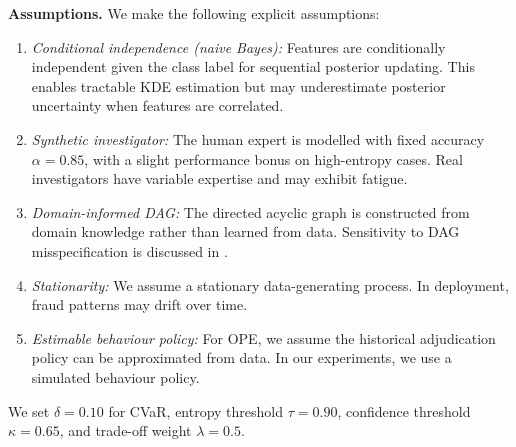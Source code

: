 \noindent\textbf{Assumptions.} We make the following explicit assumptions:
\begin{enumerate}[label=\textbf{(A\arabic*)},leftmargin=*,nosep]
    \item \textit{Conditional independence (naive Bayes):} Features are conditionally independent given the class label for sequential posterior updating. This enables tractable KDE estimation but may underestimate posterior uncertainty when features are correlated.
    \item \textit{Synthetic investigator:} The human expert is modelled with fixed accuracy $\alpha = 0.85$, with a slight performance bonus on high-entropy cases. Real investigators have variable expertise and may exhibit fatigue.
    \item \textit{Domain-informed DAG:} The directed acyclic graph is constructed from domain knowledge rather than learned from data. Sensitivity to DAG misspecification is discussed in .
    \item \textit{Stationarity:} We assume a stationary data-generating process. In deployment, fraud patterns may drift over time.
    \item \textit{Estimable behaviour policy:} For OPE, we assume the historical adjudication policy can be approximated from data. In our experiments, we use a simulated behaviour policy.
\end{enumerate}
We set $\delta = 0.10$ for CVaR, entropy threshold $\tau = 0.90$, confidence threshold $\kappa = 0.65$, and trade-off weight $\lambda = 0.5$.

